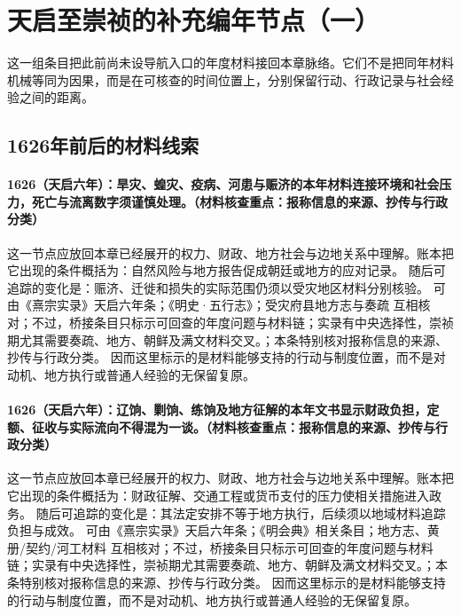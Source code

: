 \section{天启至崇祯的补充编年节点（一）}
这一组条目把此前尚未设导航入口的年度材料接回本章脉络。它们不是把同年材料机械等同为因果，而是在可核查的时间位置上，分别保留行动、行政记录与社会经验之间的距离。

\subsection{1626年前后的材料线索}

\paragraph{1626（天启六年）：旱灾、蝗灾、疫病、河患与赈济的本年材料连接环境和社会压力，死亡与流离数字须谨慎处理。（材料核查重点：报称信息的来源、抄传与行政分类）} 这一节点应放回本章已经展开的权力、财政、地方社会与边地关系中理解。账本把它出现的条件概括为：自然风险与地方报告促成朝廷或地方的应对记录。 随后可追踪的变化是：赈济、迁徙和损失的实际范围仍须以受灾地区材料分别核验。 可由《熹宗实录》天启六年条；《明史·五行志》；受灾府县地方志与奏疏 互相核对；不过，桥接条目只标示可回查的年度问题与材料链；实录有中央选择性，崇祯期尤其需要奏疏、地方、朝鲜及满文材料交叉。；本条特别核对报称信息的来源、抄传与行政分类。 因而这里标示的是材料能够支持的行动与制度位置，而不是对动机、地方执行或普通人经验的无保留复原。

\paragraph{1626（天启六年）：辽饷、剿饷、练饷及地方征解的本年文书显示财政负担，定额、征收与实际流向不得混为一谈。（材料核查重点：报称信息的来源、抄传与行政分类）} 这一节点应放回本章已经展开的权力、财政、地方社会与边地关系中理解。账本把它出现的条件概括为：财政征解、交通工程或货币支付的压力使相关措施进入政务。 随后可追踪的变化是：其法定安排不等于地方执行，后续须以地域材料追踪负担与成效。 可由《熹宗实录》天启六年条；《明会典》相关条目；地方志、黄册/契约/河工材料 互相核对；不过，桥接条目只标示可回查的年度问题与材料链；实录有中央选择性，崇祯期尤其需要奏疏、地方、朝鲜及满文材料交叉。；本条特别核对报称信息的来源、抄传与行政分类。 因而这里标示的是材料能够支持的行动与制度位置，而不是对动机、地方执行或普通人经验的无保留复原。

